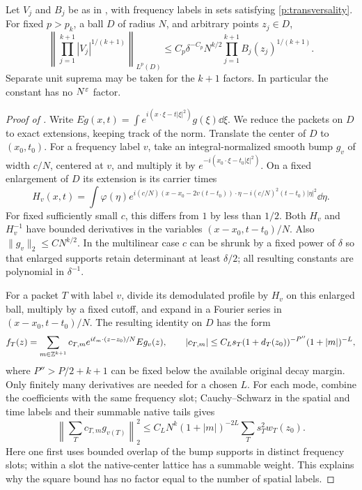 \begin{proposition}\label{p:local-multilinear}
Let $V_j$ and $B_j$ be as in , with frequency labels
in sets satisfying \eqref{p:transversality}.  For fixed $p>p_k$, a ball $D$
of radius $N$, and arbitrary points $z_j\in D$,
\begin{equation}\label{p:local-multilinear-equation}
 \left\|\prod_{j=1}^{k+1}|V_j|^{1/(k+1)}\right\|_{L^p(D)}
 \leq C_p\delta^{-C_p}N^{k/2}
 \prod_{j=1}^{k+1}B_j(z_j)^{1/(k+1)}.
\end{equation}
Separate unit suprema may be taken for the $k+1$ factors.  In particular the
constant has no $N^\varepsilon$ factor.
\end{proposition}
\begin{proof}[Proof of ]
Write
$Eg(x,t)=\int e^{i(x\cdot\xi-t|\xi|^2)}g(\xi)\dd\xi$.
We reduce the packets on $D$ to exact extensions, keeping track of the norm.
Translate the center of $D$ to $(x_0,t_0)$.  For a frequency label $v$, take
an integral-normalized smooth bump $g_v$ of width $c/N$, centered at $v$,
and multiply it by $e^{-i(x_0\cdot\xi-t_0|\xi|^2)}$.
On a fixed enlargement of $D$ its extension is its carrier times
\[
 H_v(x,t)=\int\varphi(\eta)
 e^{i(c/N)(x-x_0-2v(t-t_0))\cdot\eta
      -i(c/N)^2(t-t_0)|\eta|^2}\dd\eta.
\]
For fixed sufficiently small $c$, this differs from $1$ by less than $1/2$.
Both $H_v$ and $H_v^{-1}$ have bounded derivatives in the variables
$(x-x_0,t-t_0)/N$.  Also $\|g_v\|_2\leq C N^{k/2}$.
In the multilinear case $c$ can be shrunk by a fixed power of $\delta$ so
that enlarged supports retain determinant at least $\delta/2$; all resulting
constants are polynomial in $\delta^{-1}$.

For a packet $T$ with label $v$, divide its demodulated profile by $H_v$ on
this enlarged ball, multiply by a fixed cutoff, and expand in a Fourier
series in $(x-x_0,t-t_0)/N$.  The resulting identity on $D$ has the form
\[
 f_T(z)=\sum_{m\in\mathbb Z^{k+1}}c_{T,m}
 e^{i\ell_m\cdot(z-z_0)/N}Eg_v(z),\qquad
 |c_{T,m}|\leq C_Ls_T(1+d_T(z_0))^{-P''}(1+|m|)^{-L},
\]
where $P''>P/2+k+1$ can be fixed below the available original decay margin.
Only finitely many derivatives are needed for a chosen $L$.  For each mode,
combine the coefficients with the same frequency slot; Cauchy--Schwarz in
the spatial and time labels and their summable native tails gives
\[
 \left\|\sum_Tc_{T,m}g_{v(T)}\right\|_2^2
 \leq C_LN^k(1+|m|)^{-2L}
 \sum_Ts_T^2w_T(z_0).
\]
Here one first uses bounded overlap of the bump supports in distinct
frequency slots; within a slot the native-center lattice has a summable
weight.  This explains why the square bound has no factor equal to the
number of spatial labels.


\end{proof}

